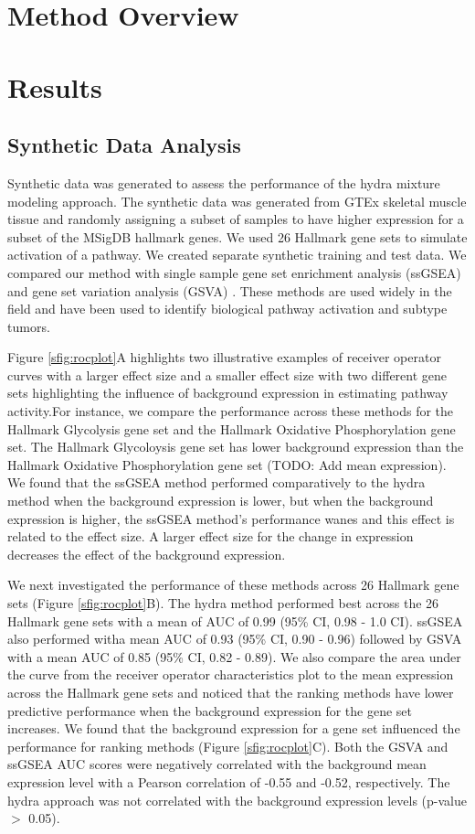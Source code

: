 \documentclass[fleqn,10pt]{wlscirep}
\begin{document}
\section*{Method Overview}


\section*{Results}

\subsection*{Synthetic Data Analysis}
Synthetic data was generated to assess the performance of the hydra mixture modeling approach. The synthetic data was generated from GTEx skeletal muscle tissue and randomly assigning a subset of samples to have higher expression for a subset of the MSigDB hallmark genes. We used 26 Hallmark gene sets to simulate activation of a pathway. We created separate synthetic training and test data. We compared our method with single sample gene set enrichment analysis (ssGSEA) \cite{barbie2009systematic} and gene set variation analysis (GSVA) \cite{hanzelmann2013gsva}. These methods are used widely in the field and have been used to identify biological pathway activation and subtype tumors. 

Figure \ref{sfig:rocplot}A highlights two illustrative examples of receiver operator curves with a larger effect size and a smaller effect size with two different gene sets highlighting the influence of background expression in estimating pathway activity.For instance, we compare the performance across these methods for the Hallmark Glycolysis gene set and the Hallmark Oxidative Phosphorylation gene set. The Hallmark Glycoloysis gene set has lower background expression than the Hallmark Oxidative Phosphorylation gene set (TODO: Add mean expression). We found that the ssGSEA method performed comparatively to the hydra method when the background expression is lower, but when the background expression is higher, the ssGSEA method's performance wanes and this effect is related to the effect size. A larger effect size for the change in expression decreases the effect of the background expression.

We next investigated the performance of these methods across 26 Hallmark gene sets (Figure \ref{sfig:rocplot}B). The hydra method performed best across the 26 Hallmark gene sets with a mean of AUC of 0.99 (95\% CI, 0.98 - 1.0 CI). ssGSEA also performed witha mean AUC of 0.93 (95\% CI, 0.90 - 0.96) followed by GSVA with a mean AUC of 0.85 (95\% CI, 0.82 - 0.89).  We also compare the area under the curve from the receiver operator characteristics plot to the mean expression across the Hallmark gene sets and noticed that the ranking methods have lower predictive performance when the background expression for the gene set increases. We found that the background expression for a gene set influenced the performance for ranking methods (Figure \ref{sfig:rocplot}C). Both the GSVA and ssGSEA AUC scores were negatively correlated with the background mean expression level with a Pearson correlation of -0.55 and -0.52, respectively. The hydra approach was not correlated with the background expression levels (p-value $>$ 0.05).
\end{document}
